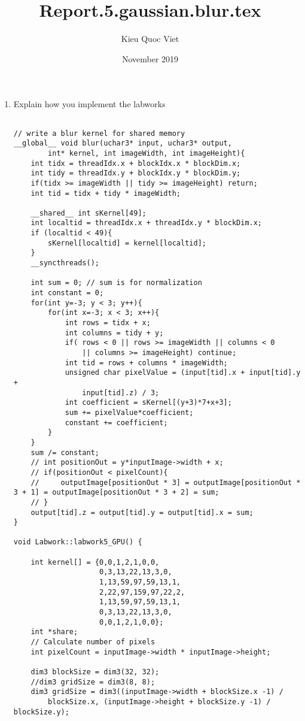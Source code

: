 \documentclass{article}
\title{Report.5.gaussian.blur.tex}
\author{Kieu Quoc Viet }
\date{November 2019}
\begin{document}
\maketitle

\begin{enumerate}
    \item Explain how you implement the labworks

    \begin{verbatim}

// write a blur kernel for shared memory
__global__ void blur(uchar3* input, uchar3* output, 
        int* kernel, int imageWidth, int imageHeight){
    int tidx = threadIdx.x + blockIdx.x * blockDim.x;
    int tidy = threadIdx.y + blockIdx.y * blockDim.y;
    if(tidx >= imageWidth || tidy >= imageHeight) return;
    int tid = tidx + tidy * imageWidth;

    __shared__ int sKernel[49];
    int localtid = threadIdx.x + threadIdx.y * blockDim.x;
    if (localtid < 49){
        sKernel[localtid] = kernel[localtid];
    }
    __syncthreads();

    int sum = 0; // sum is for normalization
    int constant = 0;
    for(int y=-3; y < 3; y++){
        for(int x=-3; x < 3; x++){
            int rows = tidx + x;
            int columns = tidy + y;
            if( rows < 0 || rows >= imageWidth || columns < 0 
                || columns >= imageHeight) continue;
            int tid = rows + columns * imageWidth;
            unsigned char pixelValue = (input[tid].x + input[tid].y +
                input[tid].z) / 3;
            int coefficient = sKernel[(y+3)*7+x+3];
            sum += pixelValue*coefficient;
            constant += coefficient;
        }
    }
    sum /= constant;
    // int positionOut = y*inputImage->width + x;
    // if(positionOut < pixelCount){
    //     outputImage[positionOut * 3] = outputImage[positionOut * 3 + 1] = outputImage[positionOut * 3 + 2] = sum;
    // }
    output[tid].z = output[tid].y = output[tid].x = sum;
}

void Labwork::labwork5_GPU() {

    int kernel[] = {0,0,1,2,1,0,0,
                    0,3,13,22,13,3,0,
                    1,13,59,97,59,13,1,
                    2,22,97,159,97,22,2,
                    1,13,59,97,59,13,1,
                    0,3,13,22,13,3,0,
                    0,0,1,2,1,0,0};
    int *share;
    // Calculate number of pixels
    int pixelCount = inputImage->width * inputImage->height;
    
    dim3 blockSize = dim3(32, 32);
    //dim3 gridSize = dim3(8, 8);
    dim3 gridSize = dim3((inputImage->width + blockSize.x -1) / 
        blockSize.x, (inputImage->height + blockSize.y -1) / blockSize.y);


\end{verbatim}
\end{enumerate}
\end{document}
